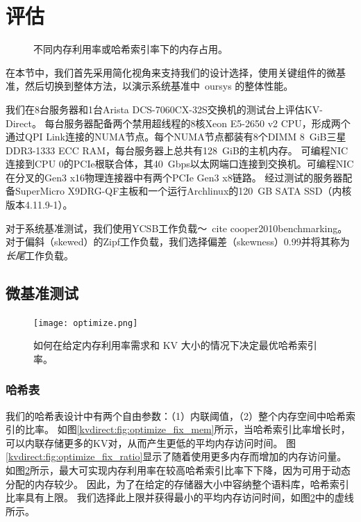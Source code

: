 \section{评估}
\label{kvdirect:sec:eval}

\begin{figure}[t]
\caption{不同内存利用率或哈希索引率下的内存占用。}
\label{kvdirect:fig:memory-access-count}
\end{figure}

\label{kvdirect:sec:evaluation}
在本节中，我们首先采用简化视角来支持我们的设计选择，使用关键组件的微基准，然后切换到整体方法，以演示系统基准中\ oursys {}的整体性能。


我们在8台服务器和1台Arista DCS-7060CX-32S交换机的测试台上评估KV-Direct。
每台服务器配备两个禁用超线程的8核Xeon E5-2650 v2 CPU，形成两个通过QPI Link连接的NUMA节点。每个NUMA节点都装有8个DIMM 8~GiB三星DDR3-1333 ECC RAM，每台服务器上总共有128~GiB的主机内存。
可编程NIC~ \cite {caulfield2016cloud}连接到CPU 0的PCIe根联合体，其40~Gbps以太网端口连接到交换机。可编程NIC在分叉的Gen3 x16物理连接器中有两个PCIe Gen3 x8链路。
经过测试的服务器配备SuperMicro X9DRG-QF主板和一个运行Archlinux的120~GB SATA SSD（内核版本4.11.9-1）。

对于系统基准测试，我们使用YCSB工作负载〜\ cite {cooper2010benchmarking}。
对于偏斜（skewed）的Zipf工作负载，我们选择偏差（skewness）0.99并将其称为\textit {长尾}工作负载。

\subsection{微基准测试}
\label{kvdirect:sec:microbenchmarks}


\begin{figure}[t]
\centering
\texttt{[image: optimize.png]}
\caption{如何在给定内存利用率需求和 KV 大小的情况下决定最优哈希索引率。}
\label{kvdirect:fig:hashline-ratio}

\end{figure}

\subsubsection{哈希表}
\label{kvdirect:sec:hashtable-eval}

我们的哈希表设计中有两个自由参数：（1）内联阈值，（2）整个内存空间中哈希索引的比率。
如图\ref {kvdirect:fig:optimize_fix_mem}所示，当哈希索引比率增长时，可以内联存储更多的KV对，从而产生更低的平均内存访问时间。
图\ref {kvdirect:fig:optimize_fix_ratio}显示了随着使用更多内存而增加的内存访问量。
如图\ref {kvdirect:fig:hashline-ratio}所示，最大可实现内存利用率在较高哈希索引比率下下降，因为可用于动态分配的内存较少。
因此，为了在给定的存储器大小中容纳整个语料库，哈希索引比率具有上限。
我们选择此上限并获得最小的平均内存访问时间，如图\ref {kvdirect:fig:hashline-ratio}中的虚线所示。

